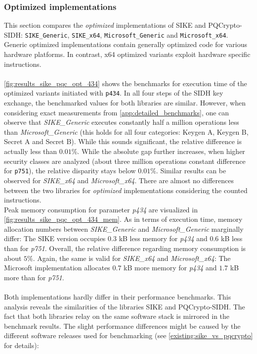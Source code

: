 \subsubsection{Optimized implementations}
This section compares the \textit{optimized} implementations of \gls{SIKE} and \gls{PQCrypto-SIDH}: \texttt{SIKE\_Generic}, \texttt{SIKE\_x64}, \texttt{Microsoft\_Generic} and  \texttt{Microsoft\_x64}.
Generic optimized implementations contain generally optimized code for various hardware platforms. In contrast, x64 optimized variants exploit hardware specific instructions.
\\\\
\autoref{fig:results_sike_pqc_opt_434} shows the benchmarks for execution time of the optimized variants initiated with \texttt{p434}. In all four steps of the \gls{SIDH} key exchange, the benchmarked values for both libraries are similar. However, when considering exact measurements from  \ref{app:detailed_benchmarks}, one can observe that \textit{SIKE\_Generic} executes constantly half a million operations less than \textit{Microsoft\_Generic} (this holds for all four categories: Keygen A, Keygen B, Secret A and Secret B). While this sounds significant, the relative difference is actually less than $0.01$\%. While the absolute gap further increases, when higher security classes are analyzed (about three million operations constant difference for \texttt{p751}), the relative disparity stays below $0.01$\%. Similar results can be observed for \textit{SIKE\_x64} and \textit{Microsoft\_x64}. There are almost no differences between the two libraries for \textit{optimized} implementations considering the counted instructions.
\\
Peak memory consumption for parameter \textit{p434} are visualized in  \autoref{fig:results_sike_pqc_opt_434_mem}. As in terms of execution time, memory allocation numbers between \textit{SIKE\_Generic} and \textit{Microsoft\_Generic} marginally differ: The \gls{SIKE} version occupies $0.3$ \gls{kB} less memory for \textit{p434} and $0.6$ \gls{kB} less than for \textit{p751}. Overall, the relative difference regarding memory consumption is about $5$\%. Again, the same is valid for \textit{SIKE\_x64} and \textit{Microsoft\_x64}: The Microsoft implementation allocates $0.7$ \gls{kB} more memory for \textit{p434} and $1.7$ \gls{kB} more than for \textit{p751}.
\\\\
Both implementations hardly differ in their performance benchmarks. This analysis reveals the similarities of the libraries \gls{SIKE} and \gls{PQCrypto-SIDH}. The fact that both libraries relay on the same software stack is mirrored in the benchmark results. The slight performance differences might be caused by the different software releases used for benchmarking (see \autoref{existing:sike_vs_pqcrypto} for details):

